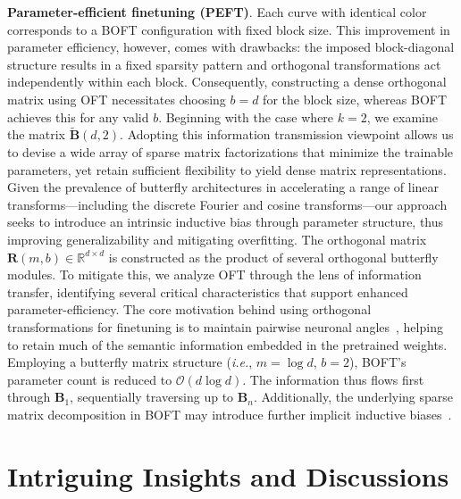 \textbf{Parameter-efficient finetuning (PEFT)}. Each curve with identical color corresponds to a BOFT configuration with fixed block size. This improvement in parameter efficiency, however, comes with drawbacks: the imposed block-diagonal structure results in a fixed sparsity pattern and orthogonal transformations act independently within each block. Consequently, constructing a dense orthogonal matrix using OFT necessitates choosing $b=d$ for the block size, whereas BOFT achieves this for any valid $b$. Beginning with the case where $k=2$, we examine the matrix $\tilde{\bm{B}}(d,2)$. Adopting this information transmission viewpoint allows us to devise a wide array of sparse matrix factorizations that minimize the trainable parameters, yet retain sufficient flexibility to yield dense matrix representations. Given the prevalence of butterfly architectures in accelerating a range of linear transforms—including the discrete Fourier and cosine transforms—our approach seeks to introduce an intrinsic inductive bias through parameter structure, thus improving generalizability and mitigating overfitting. The orthogonal matrix $\bm{R}(m,b) \in \mathbb{R}^{d\times d}$ is constructed as the product of several orthogonal butterfly modules. To mitigate this, we analyze OFT through the lens of information transfer, identifying several critical characteristics that support enhanced parameter-efficiency. The core motivation behind using orthogonal transformations for finetuning is to maintain pairwise neuronal angles~\cite{liu2018learning,liu2021orthogonal,qiu2023controlling}, helping to retain much of the semantic information embedded in the pretrained weights. Employing a butterfly matrix structure (\emph{i.e.}, $m=\log d$, $b=2$), BOFT’s parameter count is reduced to $\mathcal{O}(d\log d)$. The information thus flows first through $\bm{B}_1$, sequentially traversing up to $\bm{B}_n$. Additionally, the underlying sparse matrix decomposition in BOFT may introduce further implicit inductive biases~\cite{gunasekar2017implicit,li2018algorithmic,liu2019neural}. \section{Intriguing Insights and Discussions}

